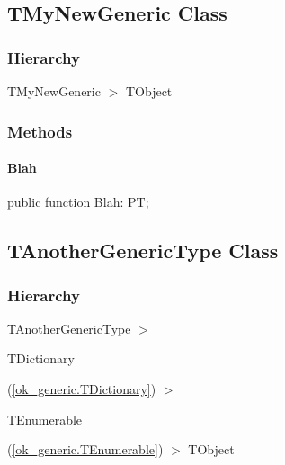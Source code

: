 \documentclass{report}
\begin{document}
\subsection*{TMyNewGeneric Class}
\subsubsection*{\large{\textbf{Hierarchy}}\normalsize\hspace{1ex}\hfill}
TMyNewGeneric {$>$} TObject
\subsubsection*{\large{\textbf{Methods}}\normalsize\hspace{1ex}\hfill}
\paragraph*{Blah}\hspace*{\fill}

\begin{list}{}{
\setlength{\itemindent}{0cm}
\setlength{\listparindent}{0cm}
\setlength{\leftmargin}{\evensidemargin}
\addtolength{\leftmargin}{\tmplength}
\settowidth{\labelsep}{X}
\addtolength{\leftmargin}{\labelsep}
\setlength{\labelwidth}{\tmplength}
}
\begin{flushleft}
\item[\textbf{Declaration}\hfill]
\begin{ttfamily}
public function Blah: PT;\end{ttfamily}


\end{flushleft}
\end{list}
\subsection*{TAnotherGenericType Class}
\subsubsection*{\large{\textbf{Hierarchy}}\normalsize\hspace{1ex}\hfill}
TAnotherGenericType {$>$} \begin{ttfamily}TDictionary\end{ttfamily}(\ref{ok_generic.TDictionary}) {$>$} \begin{ttfamily}TEnumerable\end{ttfamily}(\ref{ok_generic.TEnumerable}) {$>$} 
TObject
\end{document}
